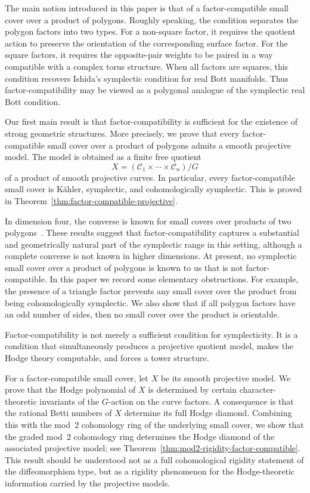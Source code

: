 \documentclass{amsart}
\numberwithin{equation}{section}
\theoremstyle{definition}
\theoremstyle{remark}
\newcommand{\cC}{\mathcal C}
\begin{document}
The main notion introduced in this paper is that of a factor-compatible small cover over a product of polygons. 
Roughly speaking, the condition separates the polygon factors into two types. 
For a non-square factor, it requires the quotient action to preserve the orientation of the corresponding surface factor. 
For the square factors, it requires the opposite-pair weights to be paired in a way compatible with a complex torus structure. 
When all factors are squares, this condition recovers Ishida's symplectic condition for real Bott manifolds.
Thus factor-compatibility may be viewed as a polygonal analogue of the symplectic real Bott condition.

Our first main result is that factor-compatibility is sufficient for the existence of strong geometric structures. 
More precisely, we prove that every factor-compatible small cover over a product of polygons admits a smooth projective model. 
The model is obtained as a finite free quotient
$$
    X=(\cC_1\times\cdots\times \cC_n)/G
$$
of a product of smooth projective curves. 
In particular, every factor-compatible small cover is K\"ahler, symplectic, and cohomologically symplectic. 
This is proved in Theorem~\ref{thm:factor-compatible-projective}.

In dimension four, the converse is known for small covers over products of two polygons~\cite{Choi2026}. 
These results suggest that factor-compatibility captures a substantial and geometrically natural part of the symplectic range in this setting, although a complete converse is not known in higher dimensions.
At present, no symplectic small cover over a product of polygons is known to us that is not factor-compatible. 
In this paper we record some elementary obstructions. 
For example, the presence of a triangle factor prevents any small cover over the product from being cohomologically symplectic. 
We also show that if all polygon factors have an odd number of sides, then no small cover over the product is orientable.

Factor-compatibility is not merely a sufficient condition for symplecticity.
It is a condition that simultaneously produces a projective quotient model, makes the Hodge theory computable, and forces a tower structure.

For a factor-compatible small cover, let $X$ be its smooth projective model. 
We prove that the Hodge polynomial of $X$ is determined by certain character-theoretic invariants of the $G$-action on the curve factors.
A consequence is that the rational Betti numbers of $X$ determine its full Hodge diamond. 
Combining this with the mod~$2$ cohomology ring of the underlying small cover, we show that the graded mod~$2$ cohomology ring determines the Hodge diamond of the associated projective model; see Theorem~\ref{thm:mod2-rigidity-factor-compatible}. 
This result should be understood not as a full cohomological rigidity statement of the diffeomorphism type, but as a rigidity phenomenon for the Hodge-theoretic information carried by the projective models.
\end{document}
